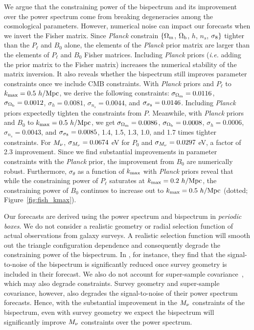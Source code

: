We argue that the constraining power of the bispectrum and its improvement 
over the power spectrum come from breaking degeneracies among the cosmological 
parameters. However, numerical noise can impact our forecasts when we invert 
the Fisher matrix. Since {\em Planck} constrain $\{\Omega_{\rm m}$, $\Omega_{\rm b}$, $h$, $n_s$, $\sigma_8\}$ 
tighter than the $P_\ell$ and $B_0$ alone, the elements of the {\em Planck} prior 
matrix are larger than the elements of $P_\ell$ and $B_0$ Fisher matrices. 
Including {\em Planck} priors (\emph{i.e.} adding the prior matrix to the 
Fisher matrix) increases the numerical stability of the matrix inversion. 
It also reveals whether the bispectrum still improves parameter constraints 
once we include CMB constraints. With {\em Planck} priors and $P_\ell$ to 
$k_{\rm max} = 0.5~h/{\rm Mpc}$, we derive the following constraints: 
$\sigma_{\Omega_{\rm m}} = 0.0116$, $\sigma_{\Omega_{\rm b}} = 0.0012$, $\sigma_h=0.0081$, 
$\sigma_{n_s}=0.0044$, and $\sigma_{\sigma_8}=0.0146$. 
Including {\em Planck} priors expectedly tighten the constraints from $P$. 
Meanwhile, with {\em Planck} priors and $B_0$ to $k_{\rm max} = 0.5~h/{\rm Mpc}$, we get 
$\sigma_{\Omega_{\rm m}} = 0.0086$, $\sigma_{\Omega_{\rm b}} = 0.0008$, $\sigma_h=0.0006$, 
$\sigma_{n_s}=0.0043$, and $\sigma_{\sigma_8}=0.0085$, 1.4, 1.5, 1.3, 1.0, and 1.7 
times tighter constraints. For $M_\nu$, $\sigma_{M_\nu} = 0.0674$ eV for $P_0$ 
and $\sigma_{M_\nu} = 0.0297$ eV, a factor of 2.3 improvement. Since we find
substantial improvements in parameter constraints with the {\em Planck} prior, 
the improvement from $B_0$ are numerically robust. Furthermore, $\sigma_\theta$ 
as a function of $k_{\rm max}$ with {\em Planck} priors reveal that while the 
constraining power of $P_\ell$ saturates at $k_{\rm max} = 0.2~h/{\rm Mpc}$, the constraining 
power of $B_0$ continues to increase out to $k_{\rm max} = 0.5~h/{\rm Mpc}$ 
(dotted; Figure~\ref{fig:fish_kmax}). 

Our forecasts are derived using the power spectrum and bispectrum in
\emph{periodic boxes}. We do not consider a realistic geometry or radial selection 
function of actual observations from galaxy 
surveys. A realistic selection function will smooth out the triangle 
configuration dependence and consequently degrade the constraining power 
of the bispectrum. In \cite{sefusatti2005}, for instance, they find that the 
signal-to-noise of the bispectrum is significantly reduced once survey geometry 
is included in their forecast. We also do not account for super-sample 
covariance~\citep[\emph{e.g.}][]{hamilton2006, sefusatti2006, takada2013, li2018}, 
which may also degrade constraints. Survey geometry and super-sample covariance, 
however, also degrades the signal-to-noise of their power spectrum forecasts. 
Hence, with the substantial improvement in the $M_\nu$ constraints of the bispectrum, 
even with survey geometry we expect the bispectrum will significantly improve 
$M_\nu$ constraints over the power spectrum.  

